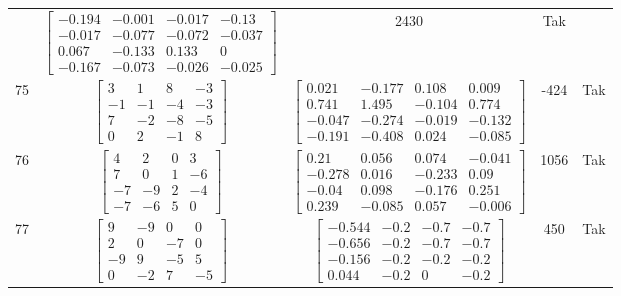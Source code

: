 \documentclass[a4paper,12pt]{article}
\begin{document}
\begin{tabular}{c c c c c}
&
$\begin{bmatrix} -0.194 & -0.001 & -0.017 & -0.13 \\ -0.017 & -0.077 & -0.072 & -0.037 \\ 0.067 & -0.133 & 0.133 & 0 \\ -0.167 & -0.073 & -0.026 & -0.025 \end{bmatrix}$
&
2430
&
Tak
\\
75
&
$\begin{bmatrix} 3 & 1 & 8 & -3 \\ -1 & -1 & -4 & -3 \\ 7 & -2 & -8 & -5 \\ 0 & 2 & -1 & 8 \end{bmatrix}$
&
$\begin{bmatrix} 0.021 & -0.177 & 0.108 & 0.009 \\ 0.741 & 1.495 & -0.104 & 0.774 \\ -0.047 & -0.274 & -0.019 & -0.132 \\ -0.191 & -0.408 & 0.024 & -0.085 \end{bmatrix}$
&
-424
&
Tak
\\
76
&
$\begin{bmatrix} 4 & 2 & 0 & 3 \\ 7 & 0 & 1 & -6 \\ -7 & -9 & 2 & -4 \\ -7 & -6 & 5 & 0 \end{bmatrix}$
&
$\begin{bmatrix} 0.21 & 0.056 & 0.074 & -0.041 \\ -0.278 & 0.016 & -0.233 & 0.09 \\ -0.04 & 0.098 & -0.176 & 0.251 \\ 0.239 & -0.085 & 0.057 & -0.006 \end{bmatrix}$
&
1056
&
Tak
\\
77
&
$\begin{bmatrix} 9 & -9 & 0 & 0 \\ 2 & 0 & -7 & 0 \\ -9 & 9 & -5 & 5 \\ 0 & -2 & 7 & -5 \end{bmatrix}$
&
$\begin{bmatrix} -0.544 & -0.2 & -0.7 & -0.7 \\ -0.656 & -0.2 & -0.7 & -0.7 \\ -0.156 & -0.2 & -0.2 & -0.2 \\ 0.044 & -0.2 & 0 & -0.2 \end{bmatrix}$
&
450
&
Tak
\\

\end{tabular}
\end{document}
